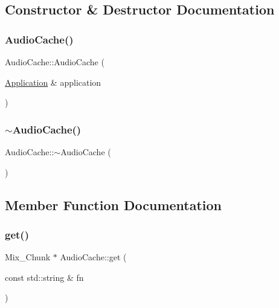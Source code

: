 \subsection{Constructor \& Destructor Documentation}
\mbox{\label{classsage_1_1AudioCache_a637030c7f7d4969e9c51563f9cc08062}} 
\subsubsection{\texorpdfstring{AudioCache()}{AudioCache()}}
{\footnotesize\ttfamily Audio\+Cache\+::\+Audio\+Cache (\begin{DoxyParamCaption}\item[{\mbox{\hyperlink{classsage_1_1Application}{Application}} \&}]{application }\end{DoxyParamCaption})}

\mbox{\label{classsage_1_1AudioCache_a83e03cef642e3988abff4846c2b962d3}} 
\subsubsection{\texorpdfstring{$\sim$AudioCache()}{~AudioCache()}}
{\footnotesize\ttfamily Audio\+Cache\+::$\sim$\+Audio\+Cache (\begin{DoxyParamCaption}{ }\end{DoxyParamCaption})}



\subsection{Member Function Documentation}
\mbox{\label{classsage_1_1AudioCache_a2a9ba507b403201dfb9d5d7b85160cb4}} 
\subsubsection{\texorpdfstring{get()}{get()}}
{\footnotesize\ttfamily Mix\+\_\+\+Chunk $\ast$ Audio\+Cache\+::get (\begin{DoxyParamCaption}\item[{const std\+::string \&}]{fn }\end{DoxyParamCaption})}

